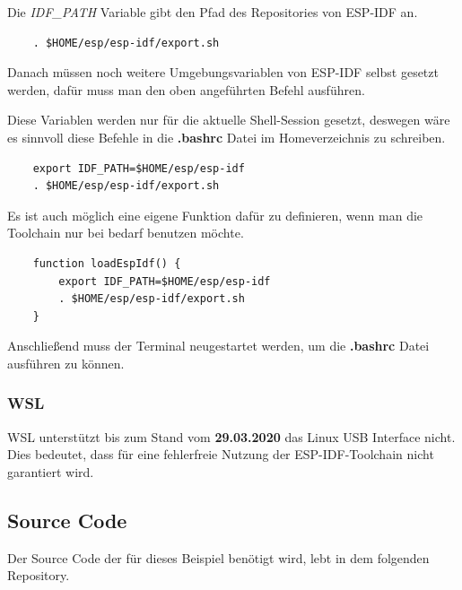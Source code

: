 Die \textit{IDF\_PATH} Variable gibt den Pfad des Repositories von ESP-IDF an.

\vspace*{10px}
\begin{verbatim}
    . $HOME/esp/esp-idf/export.sh
\end{verbatim}
\vspace*{10px}

Danach müssen noch weitere Umgebungsvariablen von ESP-IDF selbst gesetzt werden, dafür muss man den oben angeführten Befehl ausführen.

Diese Variablen werden nur für die aktuelle Shell-Session gesetzt, deswegen wäre es sinnvoll diese Befehle in die \textbf{.bashrc} Datei im Homeverzeichnis zu schreiben.

\vspace*{10px}
\begin{verbatim}
    export IDF_PATH=$HOME/esp/esp-idf
    . $HOME/esp/esp-idf/export.sh
\end{verbatim}
\vspace*{10px}

Es ist auch möglich eine eigene Funktion dafür zu definieren, wenn man die Toolchain nur bei bedarf benutzen möchte.

\vspace*{10px}
\begin{verbatim}
    function loadEspIdf() {
        export IDF_PATH=$HOME/esp/esp-idf
        . $HOME/esp/esp-idf/export.sh
    }
\end{verbatim}
\vspace*{10px}

Anschließend muss der Terminal neugestartet werden, um die \textbf{.bashrc} Datei ausführen zu können.

\subsubsection{WSL}\label{sec:wsl}

WSL unterstützt bis zum Stand vom \textbf{29.03.2020} das Linux USB Interface nicht. Dies bedeutet, dass für eine fehlerfreie Nutzung der ESP-IDF-Toolchain nicht garantiert wird.

\subsection{Source Code}\label{sec:example-source-code}

Der Source Code der für dieses Beispiel benötigt wird, lebt in dem folgenden Repository.

